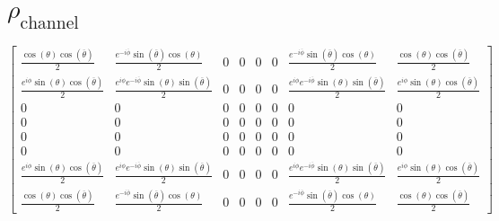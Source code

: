 \documentclass{article}
\begin{document}
\section*{$\rho_{\text{channel}}$}
\begin{dmath*}
\left[\begin{matrix}\frac{\cos{\left(\theta \right)} \cos{\left(\overline{\theta} \right)}}{2} & \frac{e^{- i \overline{\phi}} \sin{\left(\overline{\theta} \right)} \cos{\left(\theta \right)}}{2} & 0 & 0 & 0 & 0 & \frac{e^{- i \overline{\phi}} \sin{\left(\overline{\theta} \right)} \cos{\left(\theta \right)}}{2} & \frac{\cos{\left(\theta \right)} \cos{\left(\overline{\theta} \right)}}{2}\\\frac{e^{i \phi} \sin{\left(\theta \right)} \cos{\left(\overline{\theta} \right)}}{2} & \frac{e^{i \phi} e^{- i \overline{\phi}} \sin{\left(\theta \right)} \sin{\left(\overline{\theta} \right)}}{2} & 0 & 0 & 0 & 0 & \frac{e^{i \phi} e^{- i \overline{\phi}} \sin{\left(\theta \right)} \sin{\left(\overline{\theta} \right)}}{2} & \frac{e^{i \phi} \sin{\left(\theta \right)} \cos{\left(\overline{\theta} \right)}}{2}\\0 & 0 & 0 & 0 & 0 & 0 & 0 & 0\\0 & 0 & 0 & 0 & 0 & 0 & 0 & 0\\0 & 0 & 0 & 0 & 0 & 0 & 0 & 0\\0 & 0 & 0 & 0 & 0 & 0 & 0 & 0\\\frac{e^{i \phi} \sin{\left(\theta \right)} \cos{\left(\overline{\theta} \right)}}{2} & \frac{e^{i \phi} e^{- i \overline{\phi}} \sin{\left(\theta \right)} \sin{\left(\overline{\theta} \right)}}{2} & 0 & 0 & 0 & 0 & \frac{e^{i \phi} e^{- i \overline{\phi}} \sin{\left(\theta \right)} \sin{\left(\overline{\theta} \right)}}{2} & \frac{e^{i \phi} \sin{\left(\theta \right)} \cos{\left(\overline{\theta} \right)}}{2}\\\frac{\cos{\left(\theta \right)} \cos{\left(\overline{\theta} \right)}}{2} & \frac{e^{- i \overline{\phi}} \sin{\left(\overline{\theta} \right)} \cos{\left(\theta \right)}}{2} & 0 & 0 & 0 & 0 & \frac{e^{- i \overline{\phi}} \sin{\left(\overline{\theta} \right)} \cos{\left(\theta \right)}}{2} & \frac{\cos{\left(\theta \right)} \cos{\left(\overline{\theta} \right)}}{2}\end{matrix}\right]
\end{dmath*}
\end{document}

